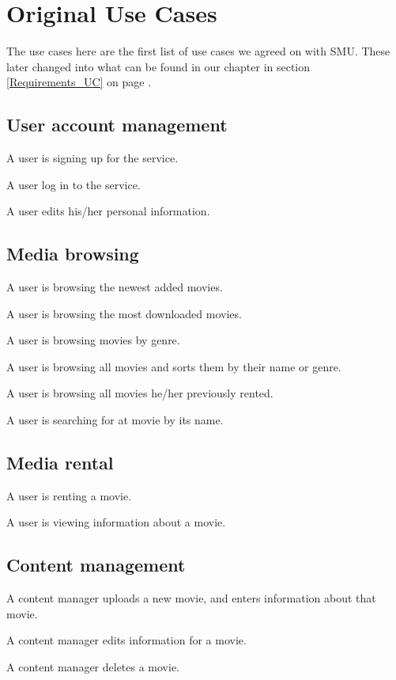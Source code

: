 \chapter{Original Use Cases}
\label{Appendix_OUC}
The use cases here are the first list of use cases we agreed on with SMU. These later changed into what can be found in our  chapter in section \ref{Requirements_UC} on page \pageref{Requirements_UC}.
\section{User account management}
\label{Appendix_OUC_UAM}
\begin{my_itemize}
\item A user is signing up for the service.
\item A user log in to the service.
\item A user edits his/her personal information.
\end{my_itemize}
\section{Media browsing}
\label{Appendix_OUC_MB}
\begin{my_itemize}
\item A user is browsing the newest added movies.
\item A user is browsing the most downloaded movies.
\item A user is browsing movies by genre.
\item A user is browsing all movies and sorts them by their name or genre.
\item A user is browsing all movies he/her previously rented.
\item A user is searching for at movie by its name.
\end{my_itemize}
\section{Media rental}
\label{Appendix_OUC_MR}
\begin{my_itemize}
\item A user is renting a movie.
\item A user is viewing information about a movie.
\end{my_itemize}
\section{Content management}
\label{Appendix_OUC_CM}
\begin{my_itemize}
\item A content manager uploads a new movie, and enters information about that movie.
\item A content manager edits information for a movie.
\item A content manager deletes a movie.
\end{my_itemize}
